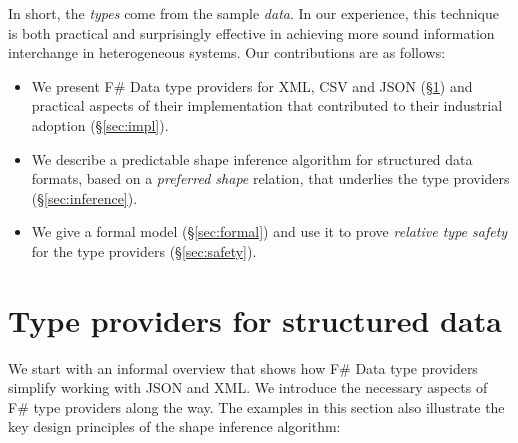 \documentclass[10pt]{sigplanconf}
\begin{document}
In short, the \emph{types} come from the sample \emph{data}. In our experience, this technique is
both practical and surprisingly effective in achieving more sound information interchange
in heterogeneous systems. Our contributions are as follows:

\begin{itemize}
\item We present F\# Data type providers for XML, CSV and JSON (\S\ref{sec:providers})
  and practical aspects of their implementation that contributed to their industrial
  adoption (\S\ref{sec:impl}).

\item We describe a predictable shape inference algorithm for structured data formats,
  based on a \emph{preferred shape} relation, that underlies the type providers
  (\S\ref{sec:inference}).

\item We give a formal model (\S\ref{sec:formal}) and use it to prove
  \emph{relative type safety} for the type providers (\S\ref{sec:safety}).
\end{itemize}



%
%

\section{Type providers for structured data}
\label{sec:providers}

We start with an informal overview that shows how F\# Data type providers simplify working with
JSON and XML. We introduce the necessary aspects of F\# type providers along the way. The examples
in this section also illustrate the key design principles of the shape inference algorithm:
\end{document}
